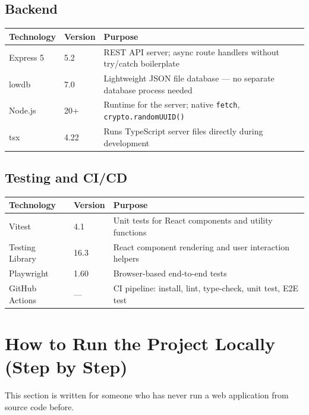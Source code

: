 \documentclass[12pt,a4paper]{article}
\begin{document}
\subsection{Backend}

\begin{longtable}{L{3.6cm} L{3cm} L{8cm}}
  \toprule
  \textbf{Technology} & \textbf{Version} & \textbf{Purpose} \\
  \midrule
  \endhead
  Express 5          & 5.2             & REST API server; async route handlers without try/catch boilerplate \\
  lowdb              & 7.0             & Lightweight JSON file database — no separate database process needed \\
  Node.js            & 20+             & Runtime for the server; native \texttt{fetch}, \texttt{crypto.randomUUID()} \\
  tsx                & 4.22            & Runs TypeScript server files directly during development \\
  \bottomrule
\end{longtable}

\subsection{Testing and CI/CD}

\begin{longtable}{L{3.6cm} L{3cm} L{8cm}}
  \toprule
  \textbf{Technology} & \textbf{Version} & \textbf{Purpose} \\
  \midrule
  \endhead
  Vitest             & 4.1             & Unit tests for React components and utility functions \\
  Testing Library    & 16.3            & React component rendering and user interaction helpers \\
  Playwright         & 1.60            & Browser-based end-to-end tests \\
  GitHub Actions     & —               & CI pipeline: install, lint, type-check, unit test, E2E test \\
  \bottomrule
\end{longtable}

\section{How to Run the Project Locally (Step by Step)}

This section is written for someone who has never run a web application from source code before.
\end{document}
